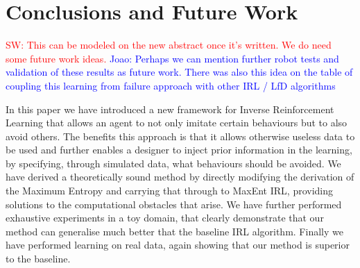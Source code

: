 \documentclass[letterpaper]{article}
\newcommand{\sw}[1]{\textcolor{red}{SW: #1}}
\newcommand{\jm}[1]{\textcolor{blue}{Joao: #1}}
\newcommand{\sw}[1]{}
\newcommand{\jm}[1]{}
\begin{document}
\section{Conclusions and Future Work}

\sw{This can be modeled on the new abstract once it's written.  We do need some future work ideas.} \jm{Perhaps we can mention further robot tests and validation of these results as future work. There was also this idea on the table of coupling this learning from failure approach with other IRL / LfD algorithms}

In this paper we have introduced a new framework for Inverse Reinforcement Learning that allows an agent to not only imitate certain behaviours but to also avoid others. The benefits this approach is that it allows otherwise useless data to be used and further enables a designer to inject prior information in the learning, by specifying, through simulated data, what behaviours should be avoided. We have derived a theoretically sound method by directly modifying the derivation of the Maximum Entropy and carrying that through to MaxEnt IRL, providing solutions to the computational obstacles that arise. We have further performed exhaustive experiments in a toy domain, that clearly demonstrate that our method can generalise much better that the baseline IRL algorithm. Finally we have performed learning on real data, again showing that our method is superior to the baseline.  



	
\end{document}
